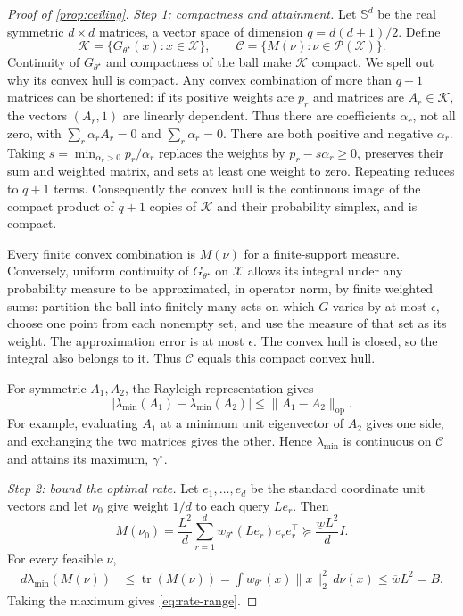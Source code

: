 \documentclass[10pt,twoside,letterpaper]{article}
\newcommand{\tr}{\operatorname{tr}}
\newcommand{\op}{\mathrm{op}}
\newcommand{\norm}[1]{\lVert #1\rVert}
\begin{document}
\begin{proof}[Proof of \cref{prop:ceiling}]
\textit{Step 1: compactness and attainment.}
Let $\mathbb S^d$ be the real symmetric $d\times d$ matrices, a vector
space of dimension $q=d(d+1)/2$. Define
\begin{equation}
\mathcal K=\{G_{\theta^\star}(x):x\in\mathcal X\},\qquad
\mathcal C=\{M(\nu):\nu\in\mathcal P(\mathcal X)\}.
\label{eq:app-feasible-matrices}
\end{equation}
Continuity of $G_{\theta^\star}$ and compactness of the ball make
$\mathcal K$ compact. We spell out why its convex hull is compact.
Any convex combination of more than $q+1$ matrices can be shortened:
if its positive weights are $p_r$ and matrices are $A_r\in\mathcal K$,
the vectors $(A_r,1)$ are linearly dependent. Thus there are coefficients
$\alpha_r$, not all zero, with
$\sum_r\alpha_rA_r=0$ and $\sum_r\alpha_r=0$.
There are both positive and negative $\alpha_r$. Taking
$s=\min_{\alpha_r>0}p_r/\alpha_r$ replaces the weights by
$p_r-s\alpha_r\ge0$, preserves their sum and weighted matrix, and
sets at least one weight to zero. Repeating reduces to $q+1$ terms.
Consequently the convex hull is the continuous image of the compact
product of $q+1$ copies of $\mathcal K$ and their probability simplex,
and is compact.

Every finite convex combination is $M(\nu)$ for a finite-support
measure. Conversely, uniform continuity of $G_{\theta^\star}$ on
$\mathcal X$ allows its integral under any probability measure to be
approximated, in operator norm, by finite weighted sums: partition the
ball into finitely many sets on which $G$ varies by at most $\epsilon$,
choose one point from each nonempty set, and use the measure of that
set as its weight. The approximation error is at most $\epsilon$.
The convex hull is closed, so the integral also belongs to it.
Thus $\mathcal C$ equals this compact convex hull.

For symmetric $A_1,A_2$, the Rayleigh representation gives
\begin{equation}
|\lambda_{\min}(A_1)-\lambda_{\min}(A_2)|
\le\norm{A_1-A_2}_{\op}.
\label{eq:app-rayleigh-continuity}
\end{equation}
For example, evaluating $A_1$ at a minimum unit eigenvector of $A_2$
gives one side, and exchanging the two matrices gives the other.
Hence $\lambda_{\min}$ is continuous on $\mathcal C$ and attains its
maximum, $\gamma^\star$.

\textit{Step 2: bound the optimal rate.}
Let $e_1,\ldots,e_d$ be the standard coordinate unit vectors and let
$\nu_0$ give weight $1/d$ to each query $Le_r$. Then
\begin{equation}
M(\nu_0)=\frac{L^2}{d}\sum_{r=1}^d
 w_{\theta^\star}(Le_r)e_re_r^\top
\succeq\frac{\underline wL^2}{d}I.
\label{eq:app-coordinate-design}
\end{equation}
For every feasible $\nu$,
\begin{align}
d\lambda_{\min}(M(\nu))
&\le\tr(M(\nu))
=\int w_{\theta^\star}(x)\norm{x}_2^2\,d\nu(x)
\le\overline wL^2=B.
\label{eq:app-trace-rate-bound}
\end{align}
Taking the maximum gives \eqref{eq:rate-range}.


\end{proof}
\end{document}
